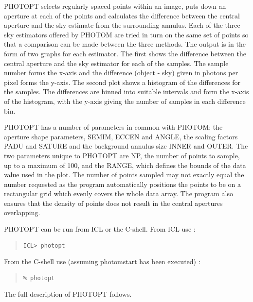 \documentclass[twoside,11pt]{article}
\renewcommand{\_}{\texttt{\symbol{95}}}
\begin{document}
PHOTOPT selects regularly spaced points within an image, puts down an
aperture at each of the points and calculates the difference between
the central aperture and the sky estimate from the surrounding annulus.
Each of the three sky estimators offered by PHOTOM are tried in turn on
the same set of points so that a comparison can be made between the three
methods. The output is in the form of two graphs for each estimator. The
first shows the difference between the central aperture and the sky
estimator for each of the samples. The sample number forms the x-axis
and the difference (object - sky) given in photons per pixel forms
the y-axis. The second plot shows a histogram of the differences for
the samples. The differences are binned into suitable intervals and form
the x-axis of the histogram, with the y-axis giving the number of samples
in each difference bin.

PHOTOPT has a number of parameters in common with PHOTOM: the aperture
shape parameters, SEMIM, ECCEN and ANGLE, the scaling factors PADU and
SATURE and the background annulus size INNER and OUTER. The two
parameters unique to PHOTOPT are NP, the number of points to sample, up
to a maximum of 100, and the RANGE, which defines the bounds of the
data value used in the plot. The number of points sampled may not exactly
equal the number requested as the program automatically positions the
points to be on a rectangular grid which evenly covers the whole data array.
The program also ensures that the density of points does not result in
the central apertures overlapping.

PHOTOPT can be run from ICL or the C-shell. From ICL use :
\begin{quote}
\begin{verbatim}
ICL> photopt
\end{verbatim}
\end{quote}
From the C-shell use (assuming photomstart has been executed) :
\begin{quote}
\begin{verbatim}
% photopt
\end{verbatim}
\end{quote}
The full description of PHOTOPT follows.
\end{document}
